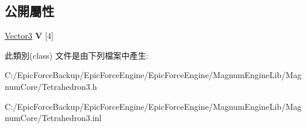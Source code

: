 \subsection*{公開屬性}
\begin{DoxyCompactItemize}
\item 
\hyperlink{class_magnum_1_1_vector3}{Vector3} {\bfseries V} \mbox{[}4\mbox{]}\hypertarget{class_magnum_1_1_tetrahedron3_aab42919521263d2929066a11cddcfaaf}{}\label{class_magnum_1_1_tetrahedron3_aab42919521263d2929066a11cddcfaaf}

\end{DoxyCompactItemize}


此類別(class) 文件是由下列檔案中產生\+:\begin{DoxyCompactItemize}
\item 
C\+:/\+Epic\+Force\+Backup/\+Epic\+Force\+Engine/\+Epic\+Force\+Engine/\+Magnum\+Engine\+Lib/\+Magnum\+Core/Tetrahedron3.\+h\item 
C\+:/\+Epic\+Force\+Backup/\+Epic\+Force\+Engine/\+Epic\+Force\+Engine/\+Magnum\+Engine\+Lib/\+Magnum\+Core/Tetrahedron3.\+inl\end{DoxyCompactItemize}
